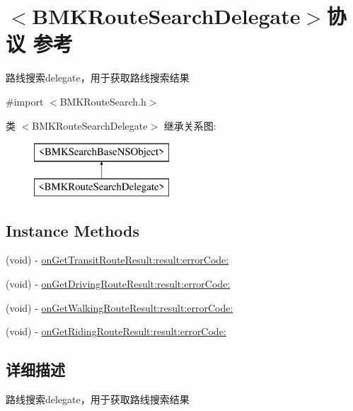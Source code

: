 \hypertarget{protocol_b_m_k_route_search_delegate-p}{}\section{$<$B\+M\+K\+Route\+Search\+Delegate$>$协议 参考}
\label{protocol_b_m_k_route_search_delegate-p}


路线搜索delegate，用于获取路线搜索结果  




{\ttfamily \#import $<$B\+M\+K\+Route\+Search.\+h$>$}

类 $<$B\+M\+K\+Route\+Search\+Delegate$>$ 继承关系图\+:\begin{figure}[H]
\begin{center}
\leavevmode
\includegraphics[height=2.000000cm]{protocol_b_m_k_route_search_delegate-p}
\end{center}
\end{figure}
\subsection*{Instance Methods}
\begin{DoxyCompactItemize}
\item 
(void) -\/ \hyperlink{protocol_b_m_k_route_search_delegate-p_adc734b9f771f0a2f600e0dc9da42fc9b}{on\+Get\+Transit\+Route\+Result\+:result\+:error\+Code\+:}
\item 
(void) -\/ \hyperlink{protocol_b_m_k_route_search_delegate-p_ad59fd0b2fd5232e5c8f36a30cc8f842f}{on\+Get\+Driving\+Route\+Result\+:result\+:error\+Code\+:}
\item 
(void) -\/ \hyperlink{protocol_b_m_k_route_search_delegate-p_aad8e804e5ef257146f31e7665a2edafa}{on\+Get\+Walking\+Route\+Result\+:result\+:error\+Code\+:}
\item 
(void) -\/ \hyperlink{protocol_b_m_k_route_search_delegate-p_ac9f166a59d8519a106be7ceaac955266}{on\+Get\+Riding\+Route\+Result\+:result\+:error\+Code\+:}
\end{DoxyCompactItemize}


\subsection{详细描述}
路线搜索delegate，用于获取路线搜索结果 

